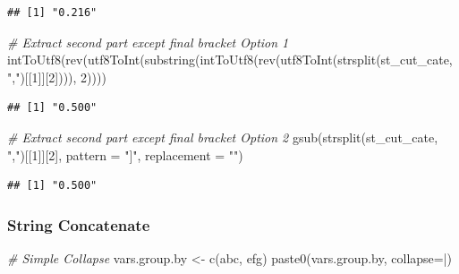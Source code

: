\documentclass[
]{book}
\newenvironment{Shaded}{\begin{snugshade}}{\end{snugshade}}
\newcommand{\AttributeTok}[1]{\textcolor[rgb]{0.77,0.63,0.00}{#1}}
\newcommand{\CommentTok}[1]{\textcolor[rgb]{0.56,0.35,0.01}{\textit{#1}}}
\newcommand{\DecValTok}[1]{\textcolor[rgb]{0.00,0.00,0.81}{#1}}
\newcommand{\FunctionTok}[1]{\textcolor[rgb]{0.00,0.00,0.00}{#1}}
\newcommand{\NormalTok}[1]{#1}
\newcommand{\OtherTok}[1]{\textcolor[rgb]{0.56,0.35,0.01}{#1}}
\newcommand{\StringTok}[1]{\textcolor[rgb]{0.31,0.60,0.02}{#1}}
\begin{document}
\begin{verbatim}
## [1] "0.216"
\end{verbatim}

\begin{Shaded}
\begin{Highlighting}[]
\CommentTok{\# Extract second part except final bracket Option 1}
\FunctionTok{intToUtf8}\NormalTok{(}\FunctionTok{rev}\NormalTok{(}\FunctionTok{utf8ToInt}\NormalTok{(}\FunctionTok{substring}\NormalTok{(}\FunctionTok{intToUtf8}\NormalTok{(}\FunctionTok{rev}\NormalTok{(}\FunctionTok{utf8ToInt}\NormalTok{(}\FunctionTok{strsplit}\NormalTok{(st\_cut\_cate, }\StringTok{","}\NormalTok{)[[}\DecValTok{1}\NormalTok{]][}\DecValTok{2}\NormalTok{]))), }\DecValTok{2}\NormalTok{))))}
\end{Highlighting}
\end{Shaded}

\begin{verbatim}
## [1] "0.500"
\end{verbatim}

\begin{Shaded}
\begin{Highlighting}[]
\CommentTok{\# Extract second part except final bracket Option 2}
\FunctionTok{gsub}\NormalTok{(}\FunctionTok{strsplit}\NormalTok{(st\_cut\_cate, }\StringTok{","}\NormalTok{)[[}\DecValTok{1}\NormalTok{]][}\DecValTok{2}\NormalTok{],  }\AttributeTok{pattern =} \StringTok{"]"}\NormalTok{, }\AttributeTok{replacement =} \StringTok{""}\NormalTok{)}
\end{Highlighting}
\end{Shaded}

\begin{verbatim}
## [1] "0.500"
\end{verbatim}

\hypertarget{string-concatenate}{%
\subsubsection{String Concatenate}\label{string-concatenate}}

\begin{Shaded}
\begin{Highlighting}[]
\CommentTok{\# Simple Collapse}
\NormalTok{vars.group.by }\OtherTok{\textless{}{-}} \FunctionTok{c}\NormalTok{(}\StringTok{\textquotesingle{}abc\textquotesingle{}}\NormalTok{, }\StringTok{\textquotesingle{}efg\textquotesingle{}}\NormalTok{)}
\FunctionTok{paste0}\NormalTok{(vars.group.by, }\AttributeTok{collapse=}\StringTok{\textquotesingle{}|\textquotesingle{}}\NormalTok{)}
\end{Highlighting}
\end{Shaded}
\end{document}
